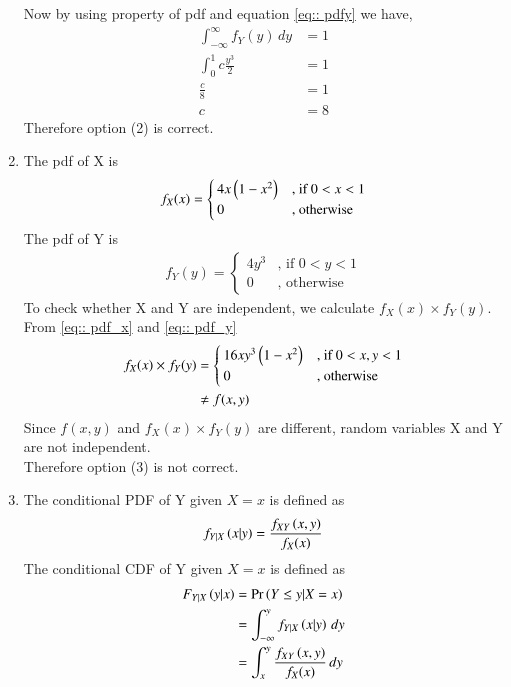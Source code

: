 \documentclass[journal,12pt,twocolumn]{IEEEtran}
\begin{document}
\begin{enumerate}
Now by using property of pdf  and equation \ref{eq:: pdfy} we have,
\begin{align}
    \int_{-\infty}^{\infty} f_Y(y) \,dy &= 1 \\
    \int_{0}^{1} c\frac{y^3}{2} & =1 \\
    \frac{c}{8} &= 1 \\
    c & = 8
\end{align}
Therefore option (2) is correct. \\
\item
The pdf of X is 
\begin{align}
\label{eq:: pdf_x}
f_X(x)  = 
\begin{cases}
4x \left(1- x^2\right) & \text{, if } 0<x<1
\\
0 & \text{, otherwise }
\end{cases}
\end{align} 
The pdf of Y is 
 \begin{align}
\label{eq:: pdf_y}
f_Y(y)  = 
\begin{cases}
 4y^3 & \text{, if } 0<y<1
\\
0 & \text{, otherwise }
\end{cases}
\end{align}   
To check whether X and Y are independent, we calculate $ f_X(x) \times f_Y(y)  $. From \ref{eq:: pdf_x} and \ref{eq:: pdf_y}
\begin{align}
f_X(x) \times f_Y(y) & = 
\begin{cases}
16xy^3 \left(1- x^2\right) & \text{, if } 0<x,y<1 
\\
0 & \text{, otherwise }
\end{cases}
\\
  &\neq f(x,y)
\end{align} 
Since $f(x,y) $ and $ f_X(x) \times f_Y(y) $ are different, random variables X and Y are not independent. \\ 
Therefore option (3) is not correct. \\
\item
The conditional PDF of Y given $X =x $ is defined as 
\begin{align}
    f_{Y|X} \left(x|y\right) = \frac{f_{XY}\left(x,y\right)}{f_X(x)}
\end{align}
The conditional CDF of Y given $X =x $ is defined as 
\begin{align}
    F_{Y|X} \brak{y|x} &= \Pr\brak{Y \le y| X= x}  \\
    &=  \int_{-\infty}^{y} f_{Y|X} \brak{x|y} \,dy  \\
    &= \int_{x}^{y}  \frac{f_{XY}\brak{x,y}}{f_X(x)} \,dy   \\

\end{align}
\end{enumerate}
\end{document}
